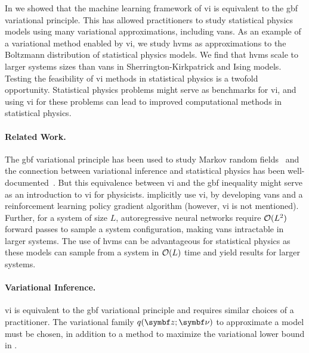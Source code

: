 In  we showed that the machine learning framework of \gls{vi} is equivalent to the \acrlong{gbf} variational principle. This has allowed practitioners to study statistical physics models using many variational approximations, including \glspl{van}. As an example of a variational method enabled by \gls{vi}, we study \glspl{hvm} as approximations to the Boltzmann distribution of statistical physics models. We find that \glspl{hvm} scale to larger systems sizes than \glspl{van} in Sherrington-Kirkpatrick and Ising models. Testing the feasibility of \gls{vi} methods in statistical physics is a twofold opportunity. Statistical physics problems might serve as benchmarks for \gls{vi}, and using \gls{vi} for these problems can lead to improved computational methods in statistical physics. %
\paragraph{Related Work.} The \gls{gbf} variational principle has been used to study Markov random fields~\citep{jun-zhang1996the-application} and the connection between variational inference and statistical physics has been well-documented~\citep{blei2017variational,hoffman2013stochastic,mackay2003information}. But this equivalence between \gls{vi} and the \gls{gbf} inequality might serve as an introduction to \gls{vi} for physicists. \citet{wu2019solving} implicitly use \gls{vi}, by developing \glspl{van} and a reinforcement learning policy gradient algorithm (however, \gls{vi} is not mentioned). Further, for a system of size $L$, autoregressive neural networks require $\mathcal{O}(L^2)$ forward passes to sample a system configuration, making \glspl{van} intractable in larger systems. The use of \glspl{hvm} can be advantageous for statistical physics as these models can sample from a system in $\mathcal{O}(L)$ time and yield results for larger systems.

\paragraph{Variational Inference.}
\gls{vi} is equivalent to the \gls{gbf} variational principle and requires similar choices of a practitioner. The variational family $q(\mbz; \mbnu)$ to approximate a model must be chosen, in addition to a method to maximize the variational lower bound in .

